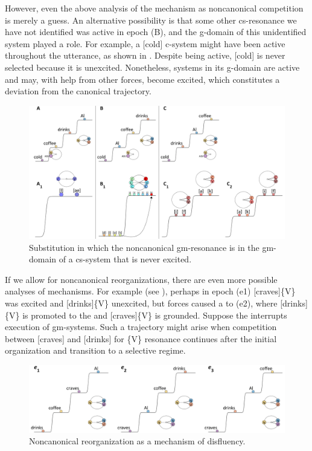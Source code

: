   However, even the above analysis of the  mechanism as noncanonical competition is merely a guess. An alternative possibility is that some other cs-resonance we have not identified was active in epoch (B), and the g-domain of this unidentified system played a role. For example, a [cold] c-system might have been active throughout the utterance, as shown in {}. Despite being active, [cold] is never selected because it is unexcited. Nonetheless, systems in its g-domain are active and may, with help from other forces, become excited, which constitutes a deviation from the canonical trajectory.

  
\begin{figure}
\includegraphics[width=\textwidth]{figures/Tilsen-img59.png}
\caption{Substitution in which the noncanonical gm-resonance is in the gm-domain of a cs-system that is never excited.}
\label{fig:4:9}
\end{figure}
 

  If we allow for noncanonical reorganizations, there are even more possible analyses of  mechanisms. For example (see {}), perhaps in epoch (e1) [craves]\{V\} was excited and [drinks]\{V\} unexcited, but  forces caused a  to (e2), where [drinks]\{V\} is promoted to the  and [craves]\{V\} is grounded. Suppose the  interrupts execution of gm-sys\-tems. Such a trajectory might arise when competition between [craves] and [drinks] for \{V\} resonance continues after the initial organization and transition to a selective regime. 

  
\begin{figure}
\includegraphics[width=\textwidth]{figures/Tilsen-img60.png}
\caption{Noncanonical reorganization as a mechanism of disfluency.}
\label{fig:4:10}
\end{figure}
 

